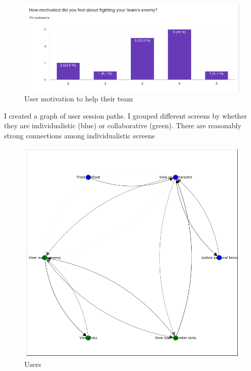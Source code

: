 \documentclass{l4proj}
\begin{document}
\begin{figure}[H]
    \centering
    \includegraphics[width=1.0\linewidth]{team_motivation.png}    
    \caption{
      User motivation to help their team
    }
    \label{fig:frogman} 
\end{figure}

I created a graph of user session paths. I grouped different screens by whether they are individualistic (blue) or collaborative (green). There are reasonably strong connections among individualistic screens
\begin{figure}[H]
    \centering
    \includegraphics[width=1.0\linewidth]{user_paths.png}    
    \caption{
      Users
    }
    \label{fig:frogman} 
\end{figure}
\end{document}
